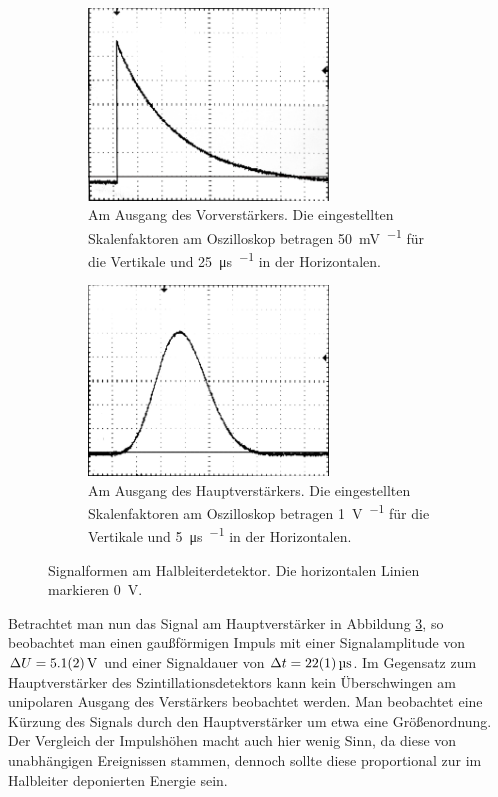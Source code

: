\documentclass[11pt, a4paper]{article}
\numberwithin{equation}{section}
\begin{document}
\begin{figure}[h]
	\centering
	\begin{subfigure}[b]{0.7\textwidth}
		\centering
		\includegraphics[width=0.7\textwidth]{./figures/signale/vor_ger_abgeschnitten.jpg}
		\caption{Am Ausgang des Vorverstärkers. Die eingestellten Skalenfaktoren am Oszilloskop betragen \SI{50}{\milli\volt\per\division} für die Vertikale und \SI{25}{\micro\second\per\division} in der Horizontalen.}
		\label{fig:signal_ger_vor}
	\end{subfigure}

	\begin{subfigure}[b]{0.7\textwidth}
		\centering
		\includegraphics[width=0.7\textwidth]{./figures/signale/haupt_ger_abgeschnitten.jpg}
		\caption{Am Ausgang des Hauptverstärkers. Die eingestellten Skalenfaktoren am Oszilloskop betragen \SI{1}{\volt\per\division} für die Vertikale und \SI{5}{\micro\second\per\division} in der Horizontalen.}
		\label{fig:signal_ger_haupt}
	\end{subfigure}
	\caption{Signalformen am Halbleiterdetektor. Die horizontalen Linien markieren \SI{0}{\volt}.}
\end{figure}
Betrachtet man nun das Signal am Hauptverstärker in Abbildung \ref{fig:signal_ger_haupt}, so beobachtet man einen gaußförmigen Impuls mit einer Signalamplitude von $\Delta U = \SI{5.1 +- 0.2}{\volt}$ und einer Signaldauer von $\Delta t = \SI{22 +- 1}{\micro\second}$.
Im Gegensatz zum Hauptverstärker des Szintillationsdetektors kann kein Überschwingen am unipolaren Ausgang des Verstärkers beobachtet werden.
Man beobachtet eine Kürzung des Signals durch den Hauptverstärker um etwa eine Größenordnung.
Der Vergleich der Impulshöhen macht auch hier wenig Sinn, da diese von unabhängigen Ereignissen stammen, dennoch sollte diese proportional zur im Halbleiter deponierten Energie sein.
\end{document}
